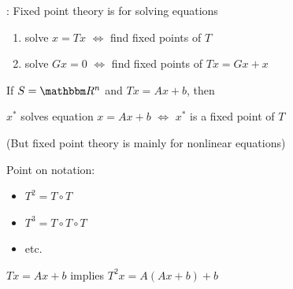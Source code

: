 \begin{frame}

    : Fixed point theory is for solving equations
    \begin{enumerate}
        \item solve $x = Tx$ $\iff$ find fixed points of $T$
        \item solve $Gx = 0$ $\iff$ find fixed points of $Tx = Gx + x$
    \end{enumerate}

    \vspace{1em}

    \Eg If $S = \RR^n$ and $T x = Ax + b$, then 
    \begin{center}
        $x^*$ solves equation  $x = Ax + b$
        $\iff$ 
        $x^*$ is a fixed point of $T$ 
    \end{center}


    \vspace{1em}
    (But fixed point theory is mainly for nonlinear equations)

    
\end{frame}


\begin{frame}
    
    Point on notation:
    \begin{itemize}
        \item $T^2 = T \circ T$
            \vspace{0.4em}
        \item $T^3 = T \circ T \circ T$
            \vspace{0.4em}
        \item etc.
    \end{itemize}
            \vspace{0.4em}
            \vspace{0.4em}
            \vspace{0.4em}


    \Eg $Tx = Ax + b$ implies $T^2x = A(Ax + b) + b$

\end{frame}



